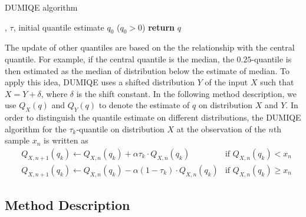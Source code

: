 \begin{algorithm}
    \caption{DUMIQE algorithm}\label{alg:DUMIQE}
    \begin{algorithmic}[1]
        , $\tau$, initial quantile estimate $q_0$ ($q_0 > 0$)
                                 
                              
                \Else                           
                \EndIf
            \EndFor
        \State \textbf{return} $q$              
    \end{algorithmic}
\end{algorithm}

The update of other quantiles are based on the the relationship with the central quantile. For example, if the central quantile is the median, the $0.25$-quantile is then estimated as the median of distribution below the estimate of median. To apply this idea, DUMIQE uses a shifted distribution $Y$ of the input $X$ such that $X = Y + \delta$, where $\delta$ is the shift constant. In the following method description, we use $Q_X(q)$ and  $Q_Y(q)$ to denote the estimate of $q$ on distribution $X$ and $Y$. In order to distinguish the quantile estimate on different distributions, the DUMIQE algorithm for the $\tau_k$-quantile on distribution $X$ at the observation of the $n$th sample $x_n$ is written as
\begin{align}
        &Q_{X, n+1}(q_k) \leftarrow Q_{X, n}(q_k) + \alpha \tau_k \cdot Q_{X, n}(q_k)  & \text{if } Q_{X, n}(q_k) < x_n \\
        &Q_{X, n+1}(q_k) \leftarrow Q_{X, n}(q_k) - \alpha (1-\tau_k) \cdot Q_{X, n}(q_k)  & \text{if } Q_{X, n}(q_k) \geq x_n \nonumber
\end{align}

\subsection{Method Description}
\label{subsec: multi_shiftQ_description}


